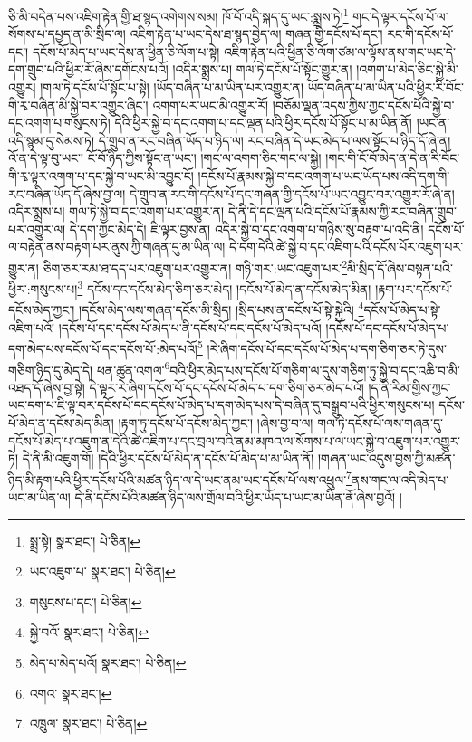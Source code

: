 ཅི་མི་བདེན་པས་འཇིག་རྟེན་གྱི་ཐ་སྙད་འགེགས་སམ། ཁོ་བོ་འདི་སྐད་དུ་ཡང་:སྨྲས་ཏེ།\footnote{སྨྲ་སྟེ།  སྣར་ཐང་།  པེ་ཅིན། } གང་དེ་ལྟར་དངོས་པོ་ལ་སོགས་པ་དཔྱད་ན་མི་སྲིད་ལ། འཇིག་རྟེན་པ་ཡང་དེས་ཐ་སྙད་བྱེད་ལ། གཞན་གྱི་དངོས་པོ་དང་། རང་གི་དངོས་པོ་དང་། དངོས་པོ་མེད་པ་ཡང་དེས་ན་ཕྱིན་ཅི་ལོག་པ་སྟེ། འཇིག་རྟེན་པའི་ཕྱིན་ཅི་ལོག་ཙམ་ལ་ལྟོས་ནས་གང་ཡང་དེ་དག་གྲུབ་པའི་ཕྱིར་རོ་ཞེས་དགོངས་པའོ། །འདིར་སྨྲས་པ། གལ་ཏེ་དངོས་པོ་སྟོང་གྱུར་ན། །འགག་པ་མེད་ཅིང་སྐྱེ་མི་འགྱུར། །གལ་ཏེ་དངོས་པོ་སྟོང་པ་སྟེ། །ཡོད་བཞིན་པ་མ་ཡིན་པར་འགྱུར་ན། ཡོད་བཞིན་པ་མ་ཡིན་པའི་ཕྱིར་རི་བོང་གི་རྭ་བཞིན་མི་སྐྱེ་བར་འགྱུར་ཞིང་། འགག་པར་ཡང་མི་འགྱུར་རོ། །བཅོམ་ལྡན་འདས་ཀྱིས་ཀྱང་དངོས་པོའི་སྐྱེ་བ་དང་འགག་པ་གསུངས་ཏེ། དེའི་ཕྱིར་སྐྱེ་བ་དང་འགག་པ་དང་ལྡན་པའི་ཕྱིར་དངོས་པོ་སྟོང་པ་མ་ཡིན་ནོ། །ཡང་ན་འདི་སྙམ་དུ་སེམས་ཏེ། དེ་གྲུབ་ན་རང་བཞིན་ཡོད་པ་ཉིད་ལ། རང་བཞིན་དེ་ཡང་མེད་པ་ལས་སྟོང་པ་ཉིད་དོ་ཞེ་ན། འོ་ན་དེ་ལྟ་བུ་ཡང་། ངོ་བོ་ཉིད་ཀྱིས་སྟོང་ན་ཡང་། །གང་ལ་འགག་ཅིང་གང་ལ་སྐྱེ། །གང་གི་ངོ་བོ་མེད་ན་དེ་ན་རི་བོང་གི་རྭ་ལྟར་འགག་པ་དང་སྐྱེ་བ་ཡང་མི་འབྱུང་ངོ། །དངོས་པོ་རྣམས་སྐྱེ་བ་དང་འགག་པ་ཡང་ཡོད་པས་འདི་དག་གི་རང་བཞིན་ཡོད་དོ་ཞེས་བྱ་ལ། དེ་གྲུབ་ན་རང་གི་དངོས་པོ་དང་གཞན་གྱི་དངོས་པོ་ཡང་འབྱུང་བར་འགྱུར་རོ་ཞེ་ན། འདིར་སྨྲས་པ། གལ་ཏེ་སྐྱེ་བ་དང་འགག་པར་འགྱུར་ན། དེ་ནི་དེ་དང་ལྡན་པའི་དངོས་པོ་རྣམས་ཀྱི་རང་བཞིན་གྲུབ་པར་འགྱུར་ལ། དེ་དག་ཀྱང་མེད་དེ། ཇི་ལྟར་བྱས་ན། འདིར་སྐྱེ་བ་དང་འགག་པ་གཉིས་སུ་བརྟག་པ་འདི་ནི། དངོས་པོ་ལ་བརྟེན་ནས་བརྟག་པར་ནུས་ཀྱི་གཞན་དུ་མ་ཡིན་ལ། དེ་དག་དེའི་ཚེ་སྐྱེ་བ་དང་འཇིག་པའི་དངོས་པོར་འཇུག་པར་གྱུར་ན། ཅིག་ཅར་རམ་ཐ་དད་པར་འཇུག་པར་འགྱུར་ན། གཉི་གར་:ཡང་འཇུག་པར་\footnote{ཡང་འཇུག་པ་  སྣར་ཐང་།  པེ་ཅིན། }མི་སྲིད་དོ་ཞེས་བསྟན་པའི་ཕྱིར་:གསུངས་པ།\footnote{གསུངས་པ་དང་།  པེ་ཅིན། } དངོས་དང་དངོས་མེད་ཅིག་ཅར་མེད། །དངོས་པོ་མེད་ན་དངོས་མེད་མིན། །རྟག་པར་དངོས་པོ་དངོས་མེད་ཀྱང་། །དངོས་མེད་ལས་གཞན་དངོས་མི་སྲིད། །སྲིད་པས་ན་དངོས་པོ་སྟེ་སྐྱེའི། \footnote{སྐྱེ་བའོ་  སྣར་ཐང་།  པེ་ཅིན། }དངོས་པོ་མེད་པ་སྟེ་འཇིག་པའོ། །དངོས་པོ་དང་དངོས་པོ་མེད་པ་ནི་དངོས་པོ་དང་དངོས་པོ་མེད་པའོ། །དངོས་པོ་དང་དངོས་པོ་མེད་པ་དག་མེད་པས་དངོས་པོ་དང་དངོས་པོ་:མེད་པའོ།\footnote{མེད་པ་མེད་པའོ།  སྣར་ཐང་།  པེ་ཅིན། } །རེ་ཞིག་དངོས་པོ་དང་དངོས་པོ་མེད་པ་དག་ཅིག་ཅར་ཏེ་དུས་གཅིག་ཉིད་དུ་མེད་དེ། ཕན་ཚུན་འགལ་\footnote{འགའ་  སྣར་ཐང་། }བའི་ཕྱིར་མེད་པས་དངོས་པོ་གཅིག་ལ་དུས་གཅིག་ཏུ་སྐྱེ་བ་དང་འཆི་བ་མི་འཐད་དོ་ཞེས་བྱ་སྟེ། དེ་ལྟར་རེ་ཞིག་དངོས་པོ་དང་དངོས་པོ་མེད་པ་དག་ཅིག་ཅར་མེད་པའོ། །ད་ནི་རིམ་གྱིས་ཀྱང་ཡང་དག་པ་ཇི་ལྟ་བར་དངོས་པོ་དང་དངོས་པོ་མེད་པ་དག་མེད་པས་དེ་བཞིན་དུ་བསྒྲུབ་པའི་ཕྱིར་གསུངས་པ། དངོས་པོ་མེད་ན་དངོས་མེད་མིན། །རྟག་ཏུ་དངོས་པོ་དངོས་མེད་ཀྱང་། །ཞེས་བྱ་བ་ལ། གལ་ཏེ་དངོས་པོ་ལས་གཞན་དུ་དངོས་པོ་མེད་པ་འཇུག་ན་དེའི་ཚེ་འཇིག་པ་དང་བྲལ་བའི་ནམ་མཁའ་ལ་སོགས་པ་ལ་ཡང་སྐྱེ་བ་འཇུག་པར་འགྱུར་ཏེ། དེ་ནི་མི་འཇུག་གོ། །དེའི་ཕྱིར་དངོས་པོ་མེད་ན་དངོས་པོ་མེད་པ་མ་ཡིན་ནོ། །གཞན་ཡང་འདུས་བྱས་ཀྱི་མཚན་ཉིད་མི་རྟག་པའི་ཕྱིར་དངོས་པོའི་མཚན་ཉིད་ལ་དེ་ཡང་ནམ་ཡང་དངོས་པོ་ལས་འཕྲུལ་\footnote{འཁྲུལ་  སྣར་ཐང་།  པེ་ཅིན། }ནས་གང་ལ་འདི་མེད་པ་ཡང་མ་ཡིན་ལ། དེ་ནི་དངོས་པོའི་མཚན་ཉིད་ལས་གྲོལ་བའི་ཕྱིར་ཡོད་པ་ཡང་མ་ཡིན་ནོ་ཞེས་བྱའོ། །
